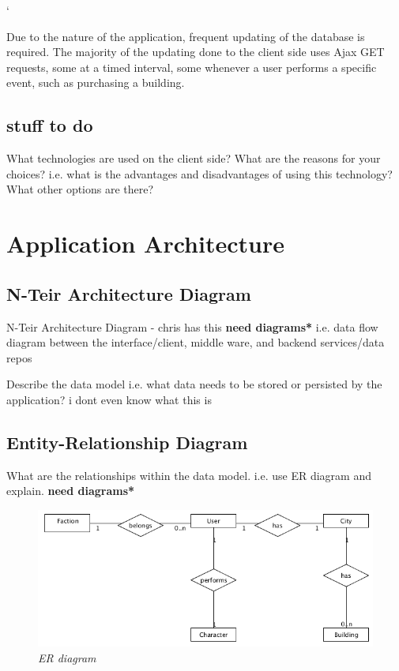 `\documentclass{sig-alt-release2}
\begin{document}
Due to the nature of the application, frequent updating of the database is required. The majority of the updating done to the client side uses Ajax GET requests, some at a timed interval, some whenever a user performs a specific event, such as purchasing a building.

\subsection{stuff to do} 

What technologies are used on the client side? 
What are the reasons for your choices? i.e. what is the advantages and disadvantages of using this technology? 
What other options are there? 

\section{Application Architecture}

\subsection{N-Teir Architecture Diagram}

N-Teir Architecture Diagram - chris has this {\bf *need diagrams*} 
i.e. data flow diagram between the interface/client, middle ware, and backend services/data repos

Describe the data model i.e. what data needs to be stored or persisted by the application? i dont even know what this is

\subsection{Entity-Relationship Diagram}

What are the relationships within the data model.
i.e. use ER diagram and explain. {\bf *need diagrams*} 

\begin{figure}[!htbp]
  \caption{\textit{ER diagram}}
  \begin{center}
		\includegraphics[scale=0.40]{img/er.png}
  \end{center}
\end{figure}
\end{document}

